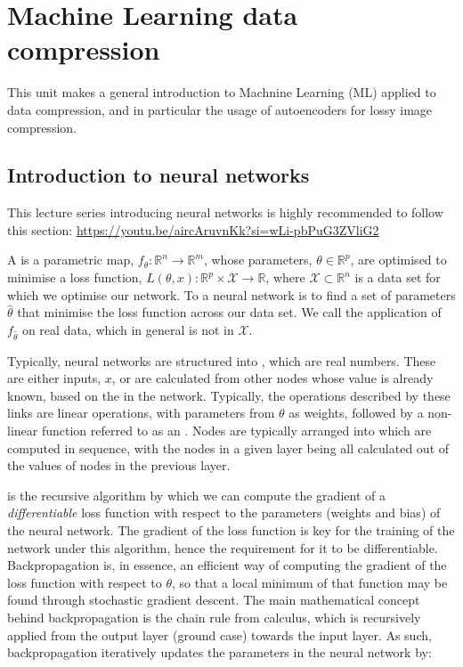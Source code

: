 \chapter{Machine Learning data compression}\label{sec:ML}

This unit makes a general introduction to Machnine Learning (ML) applied to data compression, and in particular the usage of autoencoders for lossy image compression.

\section{Introduction to neural networks}

This lecture series introducing neural networks is highly recommended to follow this section: \url{https://youtu.be/aircAruvnKk?si=wLi-pbPuG3ZVliG2}

A  is a parametric map, $f_{\theta}:\mathbb{R}^n \rightarrow \mathbb{R}^m$, whose parameters, $\theta\in \mathbb{R}^p$, are optimised to minimise a loss function, $L(\theta, x) : \mathbb{R}^p \times \mathcal{X} \rightarrow \mathbb{R}$, where $\mathcal{X}\subset\mathbb{R}^n$ is a data set for which we optimise our network. To  a neural network is to find a set of parameters $\hat{\theta}$ that minimise the loss function across our data set. We call  the application of $f_{\hat{\theta}}$ on real data, which in general is not in $\mathcal{X}$.

Typically, neural networks are structured into , which are real numbers. These are either inputs, $x$, or are calculated from other nodes whose value is already known, based on the  in the network. Typically, the operations described by these links are linear operations, with parameters from $\theta$ as weights, followed by a non-linear function referred to as an . Nodes are typically arranged into  which are computed in sequence, with the nodes in a given layer being all calculated out of the values of nodes in the previous layer. 

 is the recursive algorithm by which we can compute the gradient of a \textit{differentiable} loss function with respect to the parameters (weights and bias) of the neural network. The gradient of the loss function is key for the training of the network under this algorithm, hence the requirement for it to be differentiable. Backpropagation is, in essence, an efficient way of computing the gradient of the loss function with respect to $\theta$, so that a local minimum of that function may be found through stochastic gradient descent. The main mathematical concept behind backpropagation is the chain rule from calculus, which is recursively applied from the output layer (ground case) towards the input layer. As such, backpropagation iteratively updates the parameters in the neural network by:

